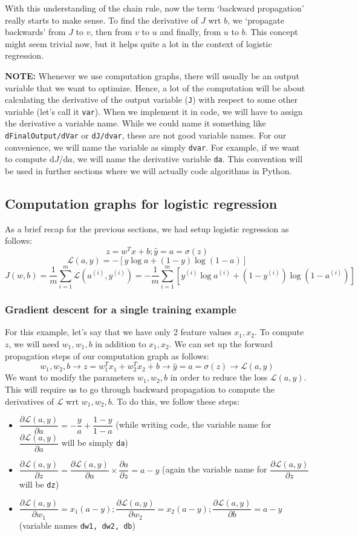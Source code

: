 \documentclass{article}[a4paper,12pt]
\theoremstyle{definition}
\newcommand{\Lagr}{\mathcal{L}}
\begin{document}
With this understanding of the chain rule, now the term `backward propagation' really starts to make sense. To find the derivative of $J$ wrt $b$, we `propagate backwards' from $J$ to $v$, then from $v$ to $u$ and finally, from $u$ to $b$. This concept might seem trivial now, but it helps quite a lot in the context of logistic regression.
\vspace{6pt}

\textbf{NOTE:} Whenever we use computation graphs, there will usually be an output variable that we want to optimize. Hence, a lot of the computation will be about calculating the derivative of the output variable (\texttt{J}) with respect to some other variable (let's call it \texttt{var}). When we implement it in code, we will have to assign the derivative a variable name. While we could name it something like \texttt{dFinalOutput/dVar} or \texttt{dJ/dvar}, these are not good variable names. For our convenience, we will name the variable as simply \texttt{dvar}. For example, if we want to compute d$J$/d$a$, we will name the derivative variable \texttt{da}. This convention will be used in further sections where we will actually code algorithms in Python.
\subsection{Computation graphs for logistic regression}
As a brief recap for the previous sections, we had setup logistic regression as follows:
$$z=w^Tx+b; \hat{y}=a=\sigma(z)$$
$$\Lagr(a,y)=-[y\log a+(1-y)\log(1-a)]$$
$$J(w,b)=\dfrac{1}{m}\sum_{i=1}^{m}\Lagr(a^{(i)},y^{(i)})=-\dfrac{1}{m}\sum_{i=1}^{m}\left[y^{(i)}\log a^{(i)}+(1-y^{(i)})\log(1-a^{(i)})\right]$$
\subsubsection{Gradient descent for a single training example}
For this example, let's say that we have only 2 feature values $x_1,x_2$. To compute $z$, we will need $w_1,w_1,b$ in addition to $x_1,x_2$. We can set up the forward propagation steps of our computation graph as follows:
$$w_1,w_2,b \longrightarrow z=w_1^Tx_1+w_2^Tx_2+b\longrightarrow \hat{y}=a=\sigma(z)\longrightarrow\Lagr(a,y)$$
We want to modify the parameters $w_1,w_2,b$ in order to reduce the loss $\Lagr(a,y)$. This will require us to go through backward propagation to compute the derivatives of $\Lagr$ wrt $w_1,w_2,b$. To do this, we follow these steps:
\begin{itemize}
	\item $\dfrac{\partial\Lagr(a,y)}{\partial a}=-\dfrac{y}{a}+\dfrac{1-y}{1-a}$ (while writing code, the variable name for $\dfrac{\partial\Lagr(a,y)}{\partial a}$ will be simply \texttt{da})
	\item $\dfrac{\partial\Lagr(a,y)}{\partial z}=\dfrac{\partial\Lagr(a,y)}{\partial a}\times\dfrac{\partial a}{\partial z}=a-y$ (again the variable name for $\dfrac{\partial\Lagr(a,y)}{\partial z}$ will be \texttt{dz})
	\item $\dfrac{\partial\Lagr(a,y)}{\partial w_1}=x_1(a-y); \dfrac{\partial\Lagr(a,y)}{\partial w_2}=x_2(a-y);\dfrac{\partial\Lagr(a,y)}{\partial b}=a-y$ (variable names \texttt{dw1, dw2, db})
\end{itemize}
\pagebreak
\end{document}
